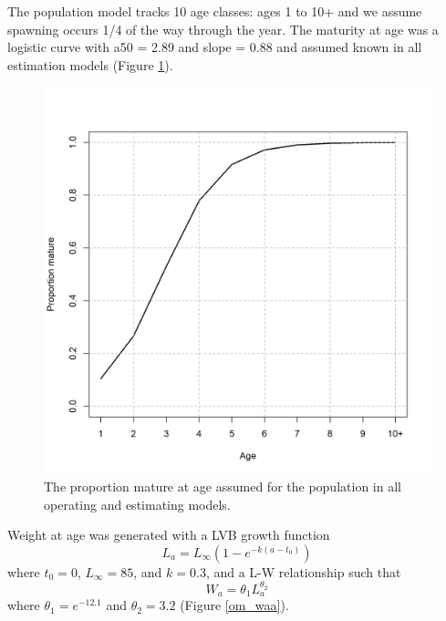 \documentclass[
  12pt,
]{article}
\begin{document}
The population model tracks 10 age classes: ages 1 to 10+ and we assume
spawning occurs 1/4 of the way through the year. The maturity at age was
a logistic curve with a50 = 2.89 and slope = 0.88 and assumed known in
all estimation models (Figure \ref{om_maturity}).

\begin{figure}
\caption{The proportion mature at age assumed for the population in all operating and estimating models.}\label{om_maturity}
\begin{center}
\includegraphics[width = \textwidth]{om_maturity.png}
\end{center}
\end{figure}

Weight at age was generated with a LVB growth function \[
L_a = L_{\infty}\left(1 - e^{-k(a - t_0)}\right)
\] where \(t_0 = 0\), \(L_\infty = 85\), and \(k = 0.3\), and a L-W
relationship such that \[
W_a = \theta_1 L_a^{\theta_2}
\] where \(\theta_1 = e^{-12.1}\) and \(\theta_2 = 3.2\) (Figure
\ref{om_waa}).
\end{document}
